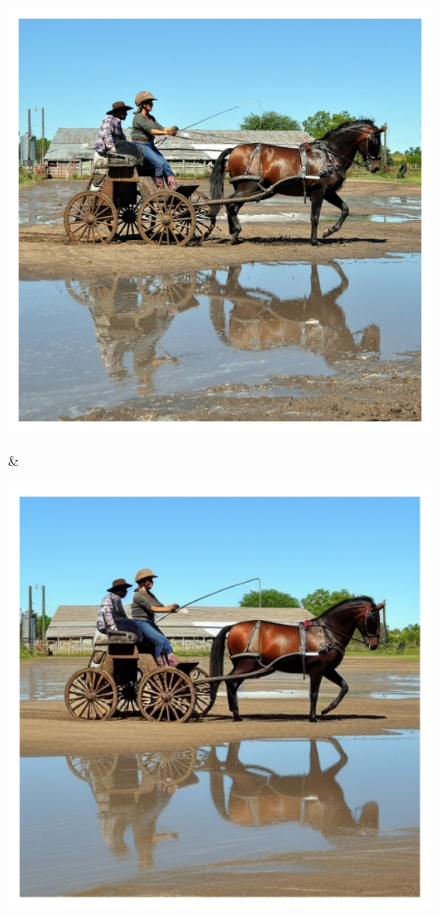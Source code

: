\documentclass[letterpaper]{article} %
\begin{document}
\begin{figure}
\begin{tabular}
\begin{minipage}{\linewidth}
    \end{minipage}
    \\
    \begin{minipage}{\linewidth}
        \includegraphics[width=\linewidth]{original_compare/24.pdf}
    \end{minipage} &
    \begin{minipage}{\linewidth}
        \includegraphics[width=\linewidth]{Ours_compare/24.pdf}

\end{minipage}
\end{tabular}
\end{figure}
\end{document}
